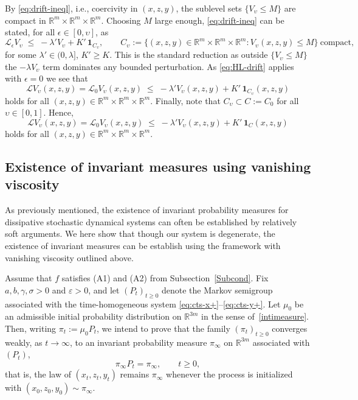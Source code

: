 \documentclass[11pt, a4paper,leqno]{amsart}
\theoremstyle{definition}
\numberwithin{equation}{section}
\newcommand{\R}{\mathbb R}
\begin{document}
By \eqref{eq:drift-ineql}, i.e., coercivity in $(x,z,y)$,  the sublevel sets $\{V_\upsilon\le M\}$ are compact in
$\R^{m}\times\R^m\times\R^m$. Choosing $M$ large enough,  \eqref{eq:drift-ineq} can be stated, for all $\epsilon\in [0,\upsilon]$, as
\begin{equation}\label{eq:HL-drift}
{\mathcal L}_\epsilon V_\upsilon\;\le\;-\lambda' V_\upsilon + K'\,\mathbf 1_{C_\upsilon},\qquad C_\upsilon:=\{(x,z,y)\in \R^{m}\times \R^m\times\R^m : V_\upsilon(x,z,y)\le M\}\ \text{compact},
\end{equation}
for some $\lambda'\in(0,\lambda]$, $K'\ge K$. This is the standard reduction as outside $\{V_\upsilon\le M\}$ the $-\lambda V_\upsilon$ term dominates any bounded perturbation. As \eqref{eq:HL-drift} applies with $\epsilon=0$ we see that
\begin{equation}\label{eq:HL-drift+-}
{\mathcal L} V_\upsilon(x,z,y)={\mathcal L}_0 V_\upsilon(x,z,y)\;\le\;-\lambda' V_\upsilon(x,z,y) + K'\,\mathbf 1_{C_\upsilon}(x,z,y)
\end{equation}
holds for all $(x,z,y)\in \R^{m}\times \R^m\times\R^m$. Finally, note that $C_\upsilon\subset C:=C_0$ for all $\upsilon\in [0,1]$. Hence,
\begin{equation}\label{eq:HL-drift+}
{\mathcal L} V_\upsilon(x,z,y)={\mathcal L}_0 V_\upsilon(x,z,y)\;\le\;-\lambda' V_\upsilon(x,z,y) + K'\,\mathbf 1_{C}(x,z,y)
\end{equation}
holds for all $(x,z,y)\in \R^{m}\times \R^m\times\R^m$.











\subsection{Existence of invariant measures using vanishing viscosity}\label{exista} As previously mentioned,  the existence of invariant probability measures for dissipative stochastic
dynamical systems can often be established by relatively soft arguments. We here show that though our system is degenerate, the existence of invariant measures can be establish using the framework with vanishing viscosity outlined above.

Assume that $f$ satisfies \textnormal{(A1)} and \textnormal{(A2)} from Subsection~\ref{Subcond}. Fix $a,b,\gamma,\sigma>0$ and $\varepsilon>0$, and let $(P_t)_{t\ge0}$ denote the Markov semigroup
associated with the time-homogeneous system \eqref{eq:cts-x+}–\eqref{eq:cts-y+}. Let $\mu_0$ be an admissible initial probability distribution on $\R^{3m}$ in the sense of~\eqref{intimeasure}. Then, writing $\pi_t := \mu_0 P_t$, we intend to prove that the family $(\pi_t)_{t\ge0}$ converges weakly, as $t\to\infty$,
to an invariant probability measure $\pi_\infty$ on $\R^{3m}$ associated with $(P_t)$,
\[
\pi_\infty P_t = \pi_\infty, \qquad t \ge 0,
\]
that is, the law of $(x_t,z_t,y_t)$ remains $\pi_\infty$ whenever the process is initialized with
$(x_0,z_0,y_0)\sim\pi_\infty$.
\end{document}
